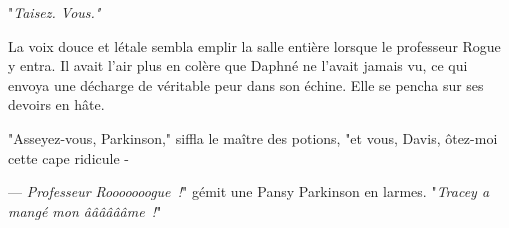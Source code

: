 "\emph{Taisez. Vous."}

La voix douce et létale sembla emplir la salle entière lorsque le professeur Rogue y entra. Il avait l'air plus en colère que Daphné ne l'avait jamais vu, ce qui envoya une décharge de véritable peur dans son échine. Elle se pencha sur ses devoirs en hâte.

"Asseyez-vous, Parkinson," siffla le maître des potions, "et vous, Davis, ôtez-moi cette cape ridicule -

--- \emph{Professeur Rooooooogue~!}" gémit une Pansy Parkinson en larmes. "\emph{Tracey a mangé mon ââââââme~!}" 

